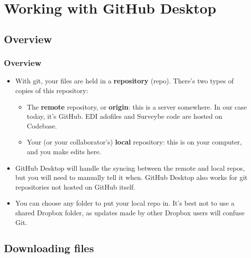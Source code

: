\documentclass{beamer}
\begin{document}
\section{Working with GitHub Desktop}

\subsection{Overview}
\begin{frame}
\frametitle{Overview}
	\begin{itemize}
		\item With git, your files are held in a \textbf{repository} (repo). There's two types of copies of this repository:
		\begin{itemize}
			\item The \textbf{remote} repository, or \textbf{origin}: this is a server somewhere. In our case today, it's GitHub. EDI adofiles and Surveybe code are hosted on Codebase.
			\item Your (or your collaborator's) \textbf{local} repository: this is on your computer, and you make edits here.
		\end{itemize}
		\item GitHub Desktop will handle the syncing between the remote and local repos, but you will need to manually tell it when. GitHub Desktop also works for git repositories not hosted on GitHub itself.
		\item You can choose any folder to put your local repo in. It's best not to use a shared 
				Dropbox folder, as updates made by other Dropbox users will confuse Git.	
	\end{itemize}
\end{frame}

\subsection{Downloading files}
\end{document}
